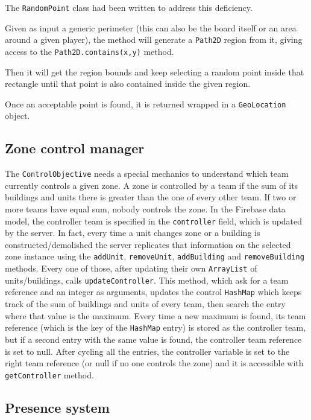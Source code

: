 			The \lstinline|RandomPoint| class had been written to address this deficiency.
			
			Given as input a generic perimeter (this can also be the board itself or an area around a given player), the method will generate a \lstinline|Path2D| region from it, giving access to the \lstinline|Path2D.contains(x,y)| method.
			
			Then it will get the region bounds and keep selecting a random point inside that rectangle until that point is also contained inside the given region.
			
			Once an acceptable point is found, it is returned wrapped in a \lstinline|GeoLocation| object.
		
		\subsection{Zone control manager}\label{focus:control}
		
			The \lstinline|ControlObjective| needs a special mechanics to understand which team currently controls a given zone.
			A zone is controlled by a team if the sum of its buildings and units there is greater than the one of every other team.
			If two or more teams have equal sum, nobody controls the zone.
			In the Firebase data model, the controller team is specified in the \lstinline|controller| field, which is updated by the server.
			In fact, every time a unit changes zone or a building is constructed/demolished the server replicates that information on the selected zone instance using the \lstinline|addUnit|, \lstinline|removeUnit|, \lstinline|addBuilding| and \lstinline|removeBuilding| methods.
			Every one of those, after updating their own \lstinline|ArrayList| of units/buildings, calls \lstinline|updateController|.
			This method, which ask for a team reference and an integer as arguments, updates the control \lstinline|HashMap| which keeps track of the sum of buildings and units of every team, then search the entry where that value is the maximum.
			Every time a new maximum is found, its team reference (which is the key of the \lstinline|HashMap| entry) is stored as the controller team, but if a second entry with the same value is found, the controller team reference is set to null.
			After cycling all the entries, the controller variable is set to the right team reference (or null if no one controls the zone) and it is accessible with \lstinline|getController| method.
		
		\subsection{Presence system}\label{focus:presence}

